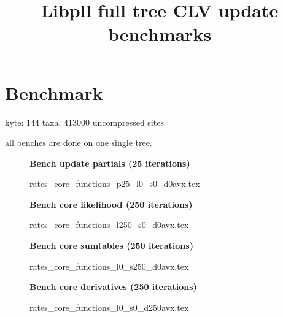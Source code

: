 \documentclass[a4paper]{article}
\begin{document}
\newcommand*{\figuretitle}[1]{%
    {\centering%
    \textbf{#1}%
    \par\medskip}%
}


\title{Libpll full tree CLV update benchmarks}
\maketitle



\section{Benchmark}

kyte: 144 taxa, 413000 uncompressed sites

all benches are done on one single tree.

\begin{figure}[!htb]
\figuretitle{Bench update partials (25 iterations)}
{rates_core_functions_p25_l0_s0_d0avx.tex}
\end{figure}


\begin{figure}[!htb]
\figuretitle{Bench core likelihood (250 iterations)}
{rates_core_functions_l250_s0_d0avx.tex}
\end{figure}

\begin{figure}[!htb]
\figuretitle{Bench core sumtables (250 iterations)}
{rates_core_functions_l0_s250_d0avx.tex}
\end{figure}


\begin{figure}[!htb]
\figuretitle{Bench core derivatives (250 iterations)}
{rates_core_functions_l0_s0_d250avx.tex}
\end{figure}
\end{document}
